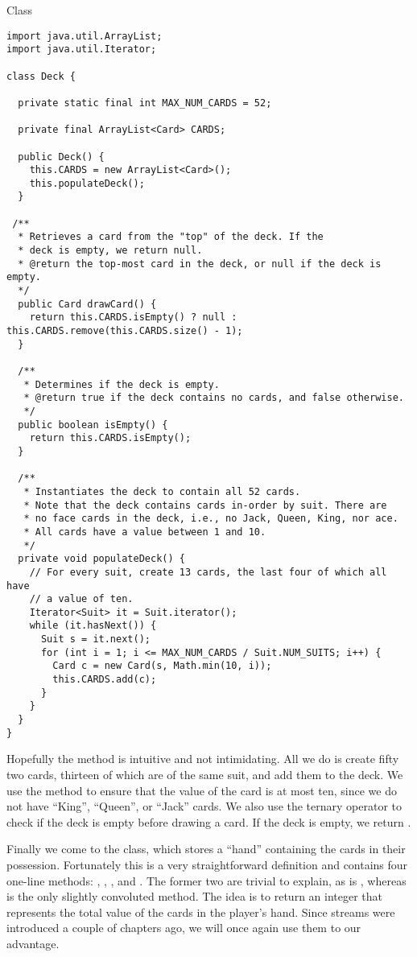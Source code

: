 \begin{cl}{ Class}
\begin{lstlisting}[language=MyJava]
import java.util.ArrayList;
import java.util.Iterator;

class Deck {

  private static final int MAX_NUM_CARDS = 52;

  private final ArrayList<Card> CARDS;

  public Deck() {
    this.CARDS = new ArrayList<Card>();
    this.populateDeck();
  }

 /**
  * Retrieves a card from the "top" of the deck. If the
  * deck is empty, we return null.
  * @return the top-most card in the deck, or null if the deck is empty.
  */
  public Card drawCard() {
    return this.CARDS.isEmpty() ? null : this.CARDS.remove(this.CARDS.size() - 1);
  }

  /**
   * Determines if the deck is empty.
   * @return true if the deck contains no cards, and false otherwise.
   */
  public boolean isEmpty() { 
    return this.CARDS.isEmpty(); 
  }

  /**
   * Instantiates the deck to contain all 52 cards.
   * Note that the deck contains cards in-order by suit. There are 
   * no face cards in the deck, i.e., no Jack, Queen, King, nor ace.
   * All cards have a value between 1 and 10.
   */
  private void populateDeck() {
    // For every suit, create 13 cards, the last four of which all have
    // a value of ten.
    Iterator<Suit> it = Suit.iterator();
    while (it.hasNext()) {
      Suit s = it.next();
      for (int i = 1; i <= MAX_NUM_CARDS / Suit.NUM_SUITS; i++) {
        Card c = new Card(s, Math.min(10, i));
        this.CARDS.add(c);
      }
    }
  }
}
\end{lstlisting}
\end{cl}

Hopefully the  method is intuitive and not intimidating. All we do is create fifty two cards, thirteen of which are of the same suit, and add them to the deck. We use the  method to ensure that the value of the card is at most ten, since we do not have ``King'', ``Queen'', or ``Jack'' cards. We also use the ternary operator to check if the deck is empty before drawing a card. If the deck is empty, we return .

Finally we come to the  class, which stores a ``hand'' containing the cards in their possession. Fortunately this is a very straightforward definition and contains four one-line methods: , , , and . The former two are trivial to explain, as is , whereas  is the only slightly convoluted method. The idea is to return an integer that represents the total value of the cards in the player's hand. Since streams were introduced a couple of chapters ago, we will once again use them to our advantage.

